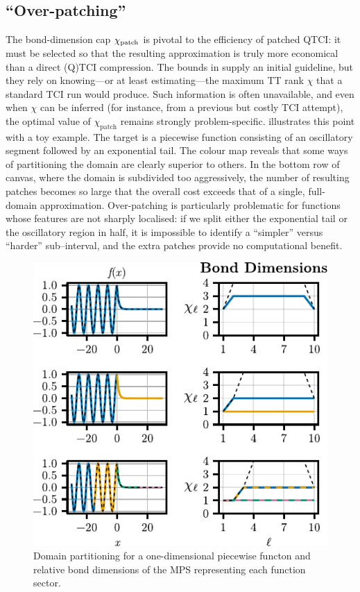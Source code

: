 \subsection{``Over-patching''}
The bond-dimension cap \(\chi_{\text{patch}}\) is pivotal to the efficiency of patched QTCI: it must be selected so that the resulting approximation is truly more economical than a direct (Q)TCI compression. The bounds in  supply an initial guideline, but they rely on knowing—or at least estimating—the maximum TT rank \(\chi\) that a standard TCI run would produce.  Such information is often unavailable, and even when \(\chi\) can be inferred (for instance, from a previous but costly TCI attempt), the optimal value of \(\chi_{\text{patch}}\) remains strongly problem-specific.
 illustrates this point with a toy example. The target is a piecewise function consisting of an oscillatory segment followed by an exponential tail. The colour map reveals that some ways of partitioning the domain are clearly superior to others. In the bottom row of canvas, where the domain is subdivided too aggressively, the number of resulting patches becomes so large that the overall cost exceeds that of a single, full-domain approximation. Over-patching is particularly problematic for functions whose features are not sharply localised: if we split either the exponential tail or the oscillatory region in half, it is impossible to identify a “simpler” versus “harder” sub–interval, and the extra patches provide no computational benefit. 


\begin{figure}[ht!]
	\centering 
	\includegraphics{figures/1DOverpatchingBonddim.pdf}
	\caption{Domain partitioning for a one-dimensional piecewise functon and relative bond dimensions of the MPS representing each function sector.}
	\label{fig:1DOverpatchingBonddim}
\end{figure}

